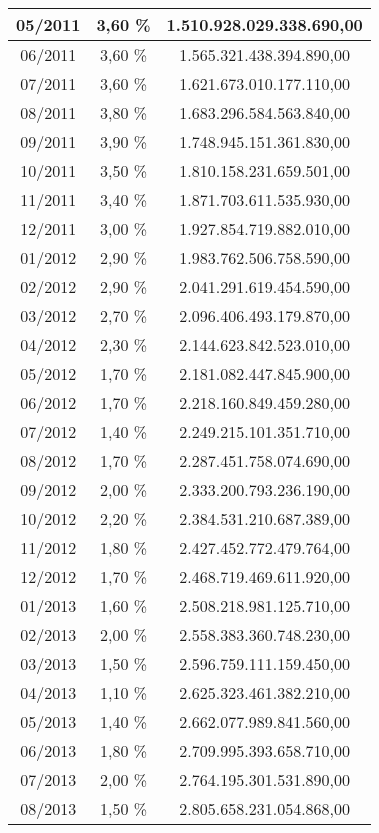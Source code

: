 \begin{center}
\begin{longtable}{|c|c|c|}
05/2011 & 3,60 \% & 1.510.928.029.338.690,00 \\ \hline
06/2011 & 3,60 \% & 1.565.321.438.394.890,00 \\ \hline
07/2011 & 3,60 \% & 1.621.673.010.177.110,00 \\ \hline
08/2011 & 3,80 \% & 1.683.296.584.563.840,00 \\ \hline
09/2011 & 3,90 \% & 1.748.945.151.361.830,00 \\ \hline
10/2011 & 3,50 \% & 1.810.158.231.659.501,00 \\ \hline
11/2011 & 3,40 \% & 1.871.703.611.535.930,00 \\ \hline
12/2011 & 3,00 \% & 1.927.854.719.882.010,00 \\ \hline
01/2012 & 2,90 \% & 1.983.762.506.758.590,00 \\ \hline
02/2012 & 2,90 \% & 2.041.291.619.454.590,00 \\ \hline
03/2012 & 2,70 \% & 2.096.406.493.179.870,00 \\ \hline
04/2012 & 2,30 \% & 2.144.623.842.523.010,00 \\ \hline
05/2012 & 1,70 \% & 2.181.082.447.845.900,00 \\ \hline
06/2012 & 1,70 \% & 2.218.160.849.459.280,00 \\ \hline
07/2012 & 1,40 \% & 2.249.215.101.351.710,00 \\ \hline
08/2012 & 1,70 \% & 2.287.451.758.074.690,00 \\ \hline
09/2012 & 2,00 \% & 2.333.200.793.236.190,00 \\ \hline
10/2012 & 2,20 \% & 2.384.531.210.687.389,00 \\ \hline
11/2012 & 1,80 \% & 2.427.452.772.479.764,00 \\ \hline
12/2012 & 1,70 \% & 2.468.719.469.611.920,00 \\ \hline
01/2013 & 1,60 \% & 2.508.218.981.125.710,00 \\ \hline
02/2013 & 2,00 \% & 2.558.383.360.748.230,00 \\ \hline
03/2013 & 1,50 \% & 2.596.759.111.159.450,00 \\ \hline
04/2013 & 1,10 \% & 2.625.323.461.382.210,00 \\ \hline
05/2013 & 1,40 \% & 2.662.077.989.841.560,00 \\ \hline
06/2013 & 1,80 \% & 2.709.995.393.658.710,00 \\ \hline
07/2013 & 2,00 \% & 2.764.195.301.531.890,00 \\ \hline
08/2013 & 1,50 \% & 2.805.658.231.054.868,00 \\ \hline

\end{longtable}
\end{center}
